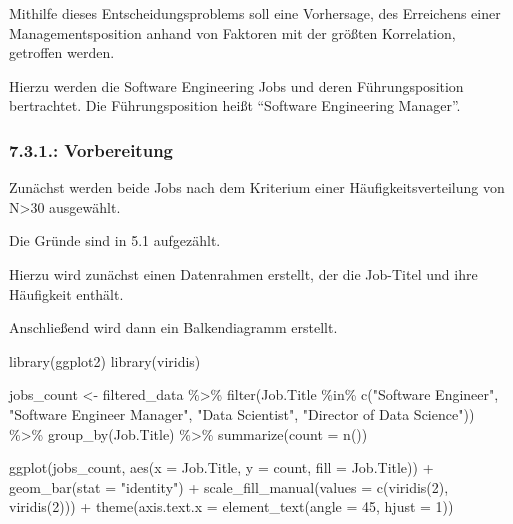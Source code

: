 \documentclass[
  letterpaper,
  DIV=11,
  numbers=noendperiod]{scrartcl}
\newenvironment{Shaded}{\begin{snugshade}}{\end{snugshade}}
\newcommand{\AttributeTok}[1]{\textcolor[rgb]{0.40,0.45,0.13}{#1}}
\newcommand{\DecValTok}[1]{\textcolor[rgb]{0.68,0.00,0.00}{#1}}
\newcommand{\FunctionTok}[1]{\textcolor[rgb]{0.28,0.35,0.67}{#1}}
\newcommand{\NormalTok}[1]{\textcolor[rgb]{0.00,0.23,0.31}{#1}}
\newcommand{\OtherTok}[1]{\textcolor[rgb]{0.00,0.23,0.31}{#1}}
\newcommand{\SpecialCharTok}[1]{\textcolor[rgb]{0.37,0.37,0.37}{#1}}
\newcommand{\StringTok}[1]{\textcolor[rgb]{0.13,0.47,0.30}{#1}}
\begin{document}
Mithilfe dieses Entscheidungsproblems soll eine Vorhersage, des
Erreichens einer Managementsposition anhand von Faktoren mit der größten
Korrelation, getroffen werden.

Hierzu werden die Software Engineering Jobs und deren Führungsposition
bertrachtet. Die Führungsposition heißt ``Software Engineering
Manager''.

\hypertarget{vorbereitung-2}{%
\subsubsection{7.3.1.: Vorbereitung}\label{vorbereitung-2}}

Zunächst werden beide Jobs nach dem Kriterium einer
Häufigkeitsverteilung von N\textgreater30 ausgewählt.

Die Gründe sind in 5.1 aufgezählt.

Hierzu wird zunächst einen Datenrahmen erstellt, der die Job-Titel und
ihre Häufigkeit enthält.

Anschließend wird dann ein Balkendiagramm erstellt.

\begin{Shaded}
\begin{Highlighting}[]
\FunctionTok{library}\NormalTok{(ggplot2)}
\FunctionTok{library}\NormalTok{(viridis)}

\NormalTok{jobs\_count }\OtherTok{\textless{}{-}}\NormalTok{ filtered\_data }\SpecialCharTok{\%\textgreater{}\%}
  \FunctionTok{filter}\NormalTok{(Job.Title }\SpecialCharTok{\%in\%} \FunctionTok{c}\NormalTok{(}\StringTok{"Software Engineer"}\NormalTok{, }\StringTok{"Software Engineer Manager"}\NormalTok{, }\StringTok{"Data Scientist"}\NormalTok{, }\StringTok{"Director of Data Science"}\NormalTok{)) }\SpecialCharTok{\%\textgreater{}\%}
  \FunctionTok{group\_by}\NormalTok{(Job.Title) }\SpecialCharTok{\%\textgreater{}\%}
  \FunctionTok{summarize}\NormalTok{(}\AttributeTok{count =} \FunctionTok{n}\NormalTok{())}

\FunctionTok{ggplot}\NormalTok{(jobs\_count, }\FunctionTok{aes}\NormalTok{(}\AttributeTok{x =}\NormalTok{ Job.Title, }\AttributeTok{y =}\NormalTok{ count, }\AttributeTok{fill =}\NormalTok{ Job.Title)) }\SpecialCharTok{+}
  \FunctionTok{geom\_bar}\NormalTok{(}\AttributeTok{stat =} \StringTok{"identity"}\NormalTok{) }\SpecialCharTok{+}
  \FunctionTok{scale\_fill\_manual}\NormalTok{(}\AttributeTok{values =} \FunctionTok{c}\NormalTok{(}\FunctionTok{viridis}\NormalTok{(}\DecValTok{2}\NormalTok{), }\FunctionTok{viridis}\NormalTok{(}\DecValTok{2}\NormalTok{))) }\SpecialCharTok{+}
  \FunctionTok{theme}\NormalTok{(}\AttributeTok{axis.text.x =} \FunctionTok{element\_text}\NormalTok{(}\AttributeTok{angle =} \DecValTok{45}\NormalTok{, }\AttributeTok{hjust =} \DecValTok{1}\NormalTok{))}
\end{Highlighting}
\end{Shaded}
\end{document}
